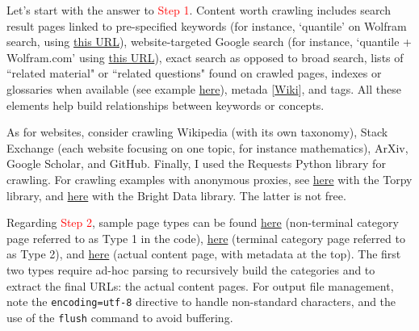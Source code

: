 \documentclass[oneside,10pt]{book}
\begin{document}
\noindent 
Let's start with the answer to \textcolor{red}{Step 1}. Content worth crawling includes search result pages linked to pre-specified keywords (for instance, `quantile' on Wolfram search,
 using \href{https://mathworld.wolfram.com/search/?query=quantile}{this URL}), website-targeted Google search  
(for instance, `quantile + Wolfram.com' using \href{https://www.google.com/search?q=quantile+\%2B+Wolfram.com}{this URL}), exact search as opposed to broad
 search,
lists of ``related material" or ``related questions" found on crawled pages,
 indexes or glossaries when available (see example \href{https://mathworld.wolfram.com/letters/}{here}), 
 \textcolor{index}{metada}  [\href{https://en.wikipedia.org/wiki/Meta_element}{Wiki}], and tags. All these elements help build 
 relationships between keywords or concepts. 

As for websites, consider crawling Wikipedia (with its own taxonomy), Stack Exchange (each website focusing on one topic, for instance mathematics), ArXiv, Google Scholar, and GitHub. Finally, I used the \textcolor{index}{Requests} Python library for crawling. 
For crawling examples with anonymous proxies, see 
\href{https://github.com/VincentGranville/Large-Language-Models/blob/main/tor_crawling.py}{here} with the 
\textcolor{index}{Torpy} library, and 
\href{https://github.com/VincentGranville/Large-Language-Models/blob/main/brightdata.py}{here} 
with the Bright Data library. The latter is not free.

Regarding \textcolor{red}{Step 2}, sample page types can be found 
\href{https://github.com/VincentGranville/Large-Language-Models/blob/main/sample-crawled-page-type-1.txt}{here} 
(non-terminal category page referred to as Type 1 in the code), 
\href{https://github.com/VincentGranville/Large-Language-Models/blob/main/sample-crawled-page-type-2.txt}{here} (terminal category page referred to as Type 2), and
\href{https://github.com/VincentGranville/Large-Language-Models/blob/main/sample-crawled-page-type-3.txt}{here}
 (actual content page, with metadata at the top). The first two types require ad-hoc parsing to recursively build the categories and to extract the final URLs:  the actual content pages. For output file management, note the \texttt{encoding=\textquotesingle utf-8\textquotesingle} directive to handle non-standard characters, 
and the use of the \texttt{flush} command to avoid buffering.
\end{document}
